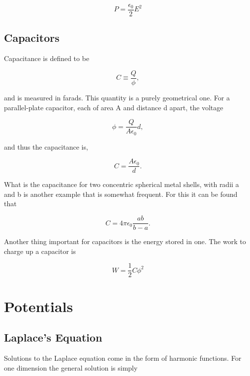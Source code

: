 \documentclass[preprint, review,12pt]{elsarticle}
\def\={\equiv}
\begin{document}
\begin{equation}
    P = \frac{\epsilon_0}{2}E^2
\end{equation}

\subsection{Capacitors}

Capacitance is defined to be

\begin{equation}
    C \= \frac{Q}{\phi},
\end{equation}

and is measured in farads. This quantity is a purely geometrical one. For a parallel-plate capacitor, each of area A and distance d apart, the voltage

\begin{equation}
    \phi = \frac{Q}{A\epsilon_0}d,
\end{equation}

and thus the capacitance is,

\begin{equation}
    C = \frac{A\epsilon_0}{d}.
\end{equation}

What is the capacitance for two concentric spherical metal shells, with radii a and b is another example that is somewhat frequent. For this it can be found that

\begin{equation}
    C = 4\pi \epsilon_0 \frac{ab}{b-a}.
\end{equation}

Another thing important for capacitors is the energy stored in one. The work to charge up a capacitor is

\begin{equation}
    W = \frac{1}{2}C \phi^2
\end{equation}

\section{Potentials}

\subsection{Laplace's Equation}

Solutions to the Laplace equation come in the form of harmonic functions. For one dimension the general solution is simply
\end{document}
